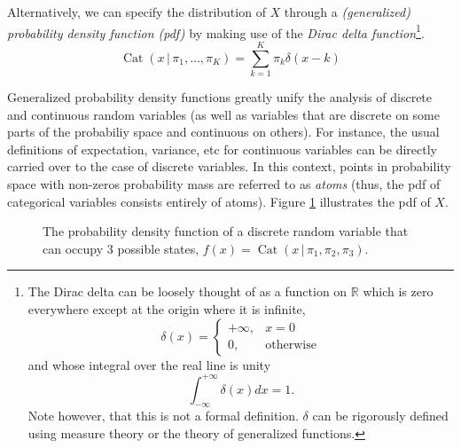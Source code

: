 \documentclass[final,3p,times,twocolumn]{elsarticle}
\DeclareMathOperator*{\Cat}{Cat}
\begin{document}
Alternatively, we can specify the distribution of $X$ through a \emph{(generalized) probability density function (pdf)} by making use of the \emph{Dirac delta function}\footnote{The Dirac delta can be loosely thought of as a function on $\mathbb{R}$ which is zero everywhere except at the origin where it is infinite,
\[\delta(x) = \left\{
\begin{array}{ll}
+\infty, & x = 0\\
0, & \mbox{otherwise}
\end{array} \right.\]
and whose integral over the real line is unity
\[ \int_{-\infty}^{+\infty}\delta(x)dx = 1.\]
Note however, that this is not a formal definition. $\delta$ can be rigorously defined using measure theory or the theory of generalized functions.}.
\begin{equation}
\label{eqn:catpdf}
\Cat(x\,|\,\pi_1,\dots,\pi_K) = \sum_{k=1}^K \pi_k \delta(x - k)
\end{equation}

Generalized probability density functions greatly unify the analysis of discrete and continuous random variables (as well as variables that are discrete on some parts of the probabiliy space and continuous on others).
For instance, the usual definitions of expectation, variance, etc for continuous variables can be directly carried over to the case of discrete variables.
In this context, points in probability space with non-zeros probability mass are referred to as \emph{atoms} (thus, the pdf of categorical variables consists entirely of atoms).
Figure \ref{fig:pmf} illustrates the pdf of $X$.

\begin{figure}
\caption{The probability density function of a discrete random variable that can occupy 3 possible states, $f(x) = \Cat(x\,|\,\pi_1,\pi_2,\pi_3)$.}
\label{fig:pmf}
\end{figure}
\end{document}
